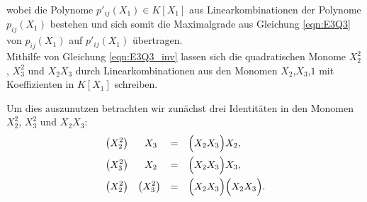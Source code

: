\documentclass[a4paper,oneside, 11pt, openany%
]{article}
\theoremstyle{custom}
\theoremstyle{custom}
\begin{document}
	wobei die Polynome $p'_{ij}\left(X_{1}\right) \in K[X_{1}]$ aus Linearkombinationen der Polynome $p_{ij}\left(X_{1}\right)$ bestehen und sich somit die Maximalgrade aus Gleichung \eqref{eqn:E3Q3} von $p_{ij}\left(X_{1}\right)$ auf $p'_{ij}\left(X_{1}\right)$ übertragen.\\
	Mithilfe von Gleichung \eqref{eqn:E3Q3_inv} lassen sich die quadratischen Monome $X_{2}^2$, $X_{3}^2$ und $X_{2}X_{3}$ durch Linearkombinationen aus den Monomen $X_{2}$,$X_{3}$,$1$ mit Koeffizienten in $K\left[X_{1}\right] $ schreiben.
	
	Um dies auszunutzen betrachten wir zunächst drei Identitäten in den Monomen $X_{2}^2$, $X_{3}^2$ und $X_{2}X_{3}$:
	\begin{equation}
		\begin{alignedat}{-1}
			&\left(X_{2}^2\right) &X_{3}\ & &=& &\Bigl(X_{2}X_{3} \Bigr)&  X_{2},\\
			&\left(X_{3}^2\right) &X_{2}\ & &=& &\Bigl(X_{2}X_{3} \Bigr)&  X_{3},\\
			&\left(X_{2}^2\right) &\left( X_{3}^2\right)&  &=& &\Bigl(X_{2}X_{3} \Bigr)&  \Bigl(X_{2}X_{3} \Bigr).
		\end{alignedat}
	\end{equation}
	
\end{document}
